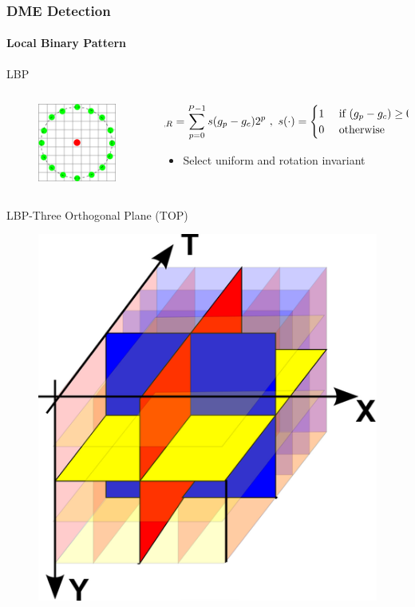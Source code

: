 \documentclass{beamer}
\begin{document}
\begin{frame}
  \frametitle{DME Detection}
  \framesubtitle{Local Binary Pattern}
  \begin{block}{LBP}
    \begin{columns}
      \begin{column}{.4\linewidth}
        \begin{figure}
          \centering
          \includegraphics[width=.4\textwidth]{./images/lbp.png}
        \end{figure}
      \end{column}
      \begin{column}{.6\linewidth}
        {\tiny
          \begin{align*}\hspace*{-1cm}
          LBP_{P,R} = \sum_{p=0}^{P-1}s(g_{p} - g_{c})2^{p} \ ,~ s(\cdot) = \begin{cases}                                  
            1  & \ \text{if } (g_{p} - g_{c}) \geq 0\\                                                                         
            0  & \ \text{otherwise}\\                                                                                          
          \end{cases} \ ,                                                                                                        
        \end{align*}}%
      \begin{itemize}[leftmargin=*]\footnotesize
        \item Select uniform and rotation invariant
      \end{itemize}
      \end{column}
    \end{columns}
  \end{block}
  \begin{block}{LBP-Three Orthogonal Plane (TOP)}
    \begin{figure}
      \centering
      \includegraphics[width=.2\textwidth]{./images/lbp_top.png}
    \end{figure}
  \end{block}
\end{frame}
\end{document}

